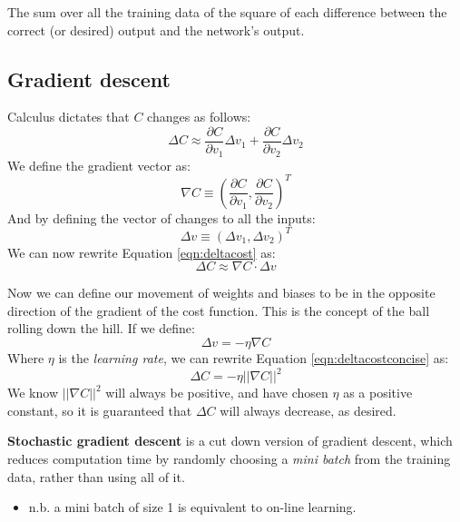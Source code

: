 \documentclass[11pt]{article}
\begin{document}
The sum over all the training data of the square of each difference between the correct (or desired) output
and the network's output.

\subsection{Gradient descent}
\label{sec:org0603717}
Calculus dictates that \(C\) changes as follows:
\begin{equation} \label{eqn:deltacost}
\Delta C \approx \frac{\partial C}{\partial v_1} \Delta v_1 + \frac{\partial C}{\partial v_2} \Delta v_2
\end{equation}
We define the gradient vector as:
\begin{equation}
\nabla C \equiv (\frac{\partial C}{\partial v_1}, \frac{\partial C}{\partial v_2})^T
\end{equation}
And by defining the vector of changes to all the inputs:
\begin{equation}
\Delta v \equiv (\Delta v_1, \Delta v_2)^T
\end{equation}
We can now rewrite Equation \ref{eqn:deltacost} as:
\begin{equation} \label{eqn:deltacostconcise}
\Delta C \approx \nabla C \cdot \Delta v
\end{equation}

Now we can define our movement of weights and biases to be in the opposite direction of the gradient
of the cost function. This is the concept of the ball rolling down the hill. If we define:
\begin{equation}
\Delta v = - \eta \nabla C
\end{equation}
Where \(\eta\) is the \emph{learning rate}, we can rewrite Equation \ref{eqn:deltacostconcise} as:
\begin{equation}
\Delta C = - \eta ||\nabla C||^2
\end{equation}
We know \(||\nabla C||^2\) will always be positive, and have chosen \(\eta\) as a positive constant, so it 
is guaranteed that \(\Delta C\) will always decrease, as desired.

\textbf{Stochastic gradient descent} is a cut down version of gradient descent, which reduces computation time by 
randomly choosing a \emph{mini batch} from the training data, rather than using all of it.
\begin{itemize}
\item n.b. a mini batch of size 1 is equivalent to on-line learning.
\end{itemize}
\end{document}
